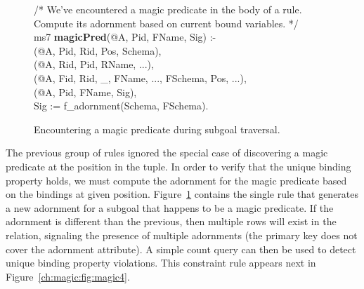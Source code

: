\begin{figure}[!t]
\ssp
\centering
\begin{boxedminipage}{\linewidth}
/* We've encountered a magic predicate in the body of a rule. \\
   Compute its adornment based on current bound variables. */ \\
ms7 {\bf magicPred}(@A, Pid, FName, Sig) :- \\
(@A, Pid, Rid, Pos, Schema), \\
(@A, Rid, Pid, RName, ...), \\
(@A, Fid, Rid, \_, FName, ..., FSchema, Pos, ...), \\
(@A, Pid, FName, Sig), \\
\datalogspace Sig := f\_adornment(Schema, FSchema).

\end{boxedminipage}
\caption{\label{ch:magic:fig:magic3}Encountering a magic predicate during subgoal traversal.}
\end{figure}

The previous group of rules ignored the special case of discovering a magic
predicate at the position in the  tuple.  In order to verify that
the unique binding property holds, we must compute the adornment for the magic
predicate based on the bindings at given position.
Figure~\ref{ch:magic:fig:magic3} contains the single rule that generates a new
adornment for a subgoal that happens to be a magic predicate.  If the adornment
is different than the previous, then multiple rows will exist in the
 relation, signaling the presence of multiple adornments (the
primary key does not cover the adornment attribute).  A simple count query can
then be used to detect unique binding property violations.  This constraint
rule appears next in Figure~\ref{ch:magic:fig:magic4}.

